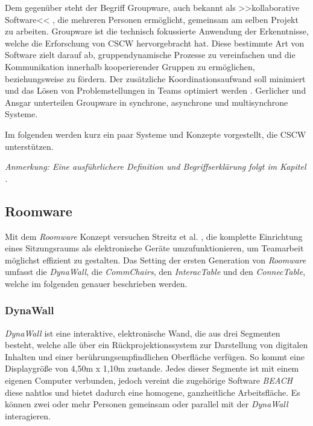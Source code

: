 Dem gegenüber steht der Begriff Groupware, auch bekannt als >>kollaborative Software<< \citep{Bannon:1990p244}, die mehreren Personen ermöglicht, gemeinsam am selben Projekt zu arbeiten. Groupware ist die technisch fokussierte Anwendung der Erkenntnisse, welche die Erforschung von \ac{CSCW} hervorgebracht hat. Diese bestimmte Art von Software zielt darauf ab, gruppendynamische Prozesse zu vereinfachen und die Kommunikation innerhalb kooperierender Gruppen zu ermöglichen, beziehungsweise zu fördern. Der zusätzliche Koordinationsaufwand soll minimiert und das Lösen von Problemstellungen in Teams optimiert werden \citep{Rama:2006p245}. Gerlicher und Ansgar \citep{Gerlicher:2007p241} unterteilen Groupware in synchrone, asynchrone und multisynchrone Systeme.

Im folgenden werden kurz ein paar Systeme und Konzepte vorgestellt, die \ac{CSCW} unterstützen. 

\bigskip \emph{Anmerkung: \graffito{\(\clubsuit\)} Eine ausführlichere Definition und Begriffserklärung folgt im Kapitel .}

\subsection{Roomware} 

Mit dem \emph{Roomware} Konzept versuchen Streitz et al. \citep{Streitz:2001p213, Streitz:2002p214, Tandler:2002p219}, die komplette Einrichtung eines Sitzungsraums als elektronische Geräte umzufunktionieren, um Teamarbeit möglichst effizient zu gestalten. Das Setting der ersten Generation von \emph{Roomware} \citep{Streitz:2001p213} umfasst die \emph{DynaWall}, die \emph{CommChairs}, den \emph{InteracTable} und den \emph{ConnecTable}, welche im folgenden genauer beschrieben werden.

\subsubsection{DynaWall} 

\emph{DynaWall} ist eine interaktive, elektronische Wand, die aus drei Segmenten besteht, welche alle über ein Rückprojektionssystem zur Darstellung von digitalen Inhalten und einer berührungsempfindlichen Oberfläche verfügen. So kommt eine Displaygröße von 4,50m x 1,10m zustande. Jedes dieser Segmente ist mit einem eigenen Computer verbunden, jedoch vereint die zugehörige Software \emph{BEACH} \citep{Tandler:2000p238} diese nahtlos und bietet dadurch eine homogene, ganzheitliche Arbeitsfläche. Es können zwei oder mehr Personen gemeinsam oder parallel mit der \emph{DynaWall} interagieren. 

